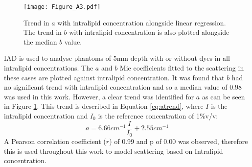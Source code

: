 \begin{figure}[h!]
    \centering
    \texttt{[image: Figure\_A3.pdf]}
    \caption{Trend in $a$ with intralipid concentration alongside linear regression. The trend in $b$ with intralipid concentration is also plotted alongside the median $b$ value.}
 \label{fig:atrend}
\end{figure}

IAD\cite{Prahl2017} is used to analyse phantoms of 5mm depth with or without dyes in all intralipid concentrations. The $a$ and $b$ Mie coefficients fitted to the scattering in these cases are plotted against intralipid concentration. It was found that $b$ had no significant trend with intralipid concentration and so a median value of 0.98 was used in this work.
However, a clear trend was identified for $a$ as can be seen in Figure \ref{fig:atrend}. 
This trend is described in Equation \eqref{eq:atrend}, where $I$ is the intralipid concentration and $I_0$ is the reference concentration of 1\%v/v: 
\begin{equation}
    a = 6.66cm^{-1}\frac{I}{I_0} + 2.55cm^{-1}
    \label{eq:atrend}
\end{equation}
A Pearson correlation coefficient ($r$) of 0.99 and p of 0.00 was observed, therefore this is used throughout this work to model scattering based on Intralipid concentration.

